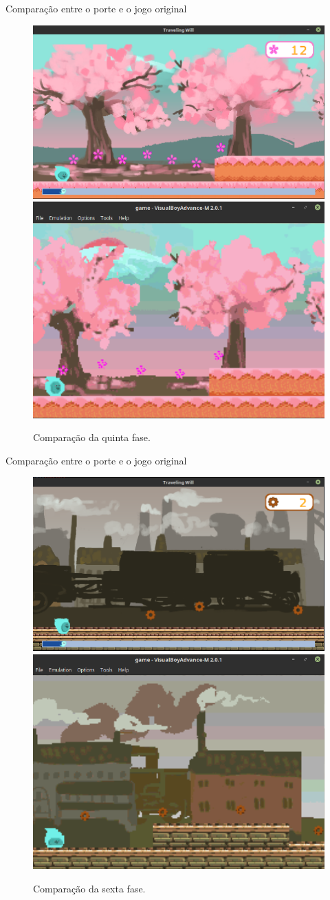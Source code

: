 \documentclass[notes, mathserif]{beamer}
\begin{document}
\begin{frame}{Compara\c c\~ao entre o porte e o jogo original}
	\begin{figure}%
    \includegraphics[width=.5\linewidth]{figuras/pc-fase5.png}
    \qquad
    \includegraphics[width=.4\linewidth]{figuras/gba-fase5.png}
    \caption{Compara\c c\~ao da quinta fase.}%
    \label{fig:comp1}%
	\end{figure}
\end{frame}

\begin{frame}{Compara\c c\~ao entre o porte e o jogo original}
	\begin{figure}%
    \includegraphics[width=.5\linewidth]{figuras/pc-fase6.png}
    \qquad
    \includegraphics[width=.4\linewidth]{figuras/gba-fase6.png}
    \caption{Compara\c c\~ao da sexta fase.}%
    \label{fig:comp1}%
	\end{figure}
\end{frame}
\end{document}
